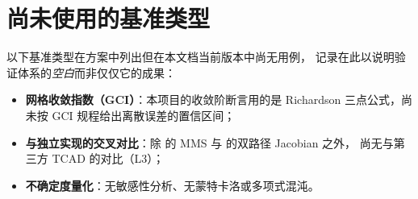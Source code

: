 \section{尚未使用的基准类型}

以下基准类型在方案中列出但在本文档当前版本中尚无用例，
记录在此以说明验证体系的\emph{空白}而非仅仅它的成果：

\begin{itemize}[leftmargin=1.7em,itemsep=0.28em,topsep=0.35em]
  \item \textbf{网格收敛指数（GCI）}：本项目的收敛阶断言用的是
        Richardson 三点公式，尚未按 GCI 规程给出离散误差的置信区间；
  \item \textbf{与独立实现的交叉对比}：除 
        的 MMS 与  的双路径 Jacobian 之外，
        尚无与第三方 TCAD 的对比（L3）；
  \item \textbf{不确定度量化}：无敏感性分析、无蒙特卡洛或多项式混沌。
\end{itemize}

\cleardoublepage
